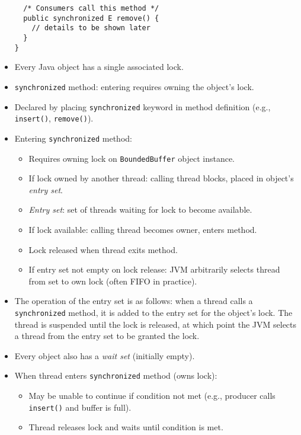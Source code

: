 \begin{itemize}
\begin{verbatim}
  /* Consumers call this method */
  public synchronized E remove() {
    // details to be shown later
  }
}
    \end{verbatim}
    \item Every Java object has a single associated lock.
    \item \texttt{synchronized} method: entering requires owning the object's lock.
    \item Declared by placing \texttt{synchronized} keyword in method definition (e.g., \texttt{insert()}, \texttt{remove()}).
    \item Entering \texttt{synchronized} method:
    \begin{itemize}
        \item Requires owning lock on \texttt{BoundedBuffer} object instance.
        \item If lock owned by another thread: calling thread blocks, placed in object's \textit{entry set}.
        \item \textit{Entry set}: set of threads waiting for lock to become available.
        \item If lock available: calling thread becomes owner, enters method.
        \item Lock released when thread exits method.
        \item If entry set not empty on lock release: JVM arbitrarily selects thread from set to own lock (often FIFO in practice).
    \end{itemize}
    \item The operation of the entry set is as follows: when a thread calls a \texttt{synchronized} method, it is added to the entry set for the object's lock. The thread is suspended until the lock is released, at which point the JVM selects a thread from the entry set to be granted the lock.
    \item Every object also has a \textit{wait set} (initially empty).
    \item When thread enters \texttt{synchronized} method (owns lock):
    \begin{itemize}
        \item May be unable to continue if condition not met (e.g., producer calls \texttt{insert()} and buffer is full).
        \item Thread releases lock and waits until condition is met.
    \end{itemize}
\end{itemize}

